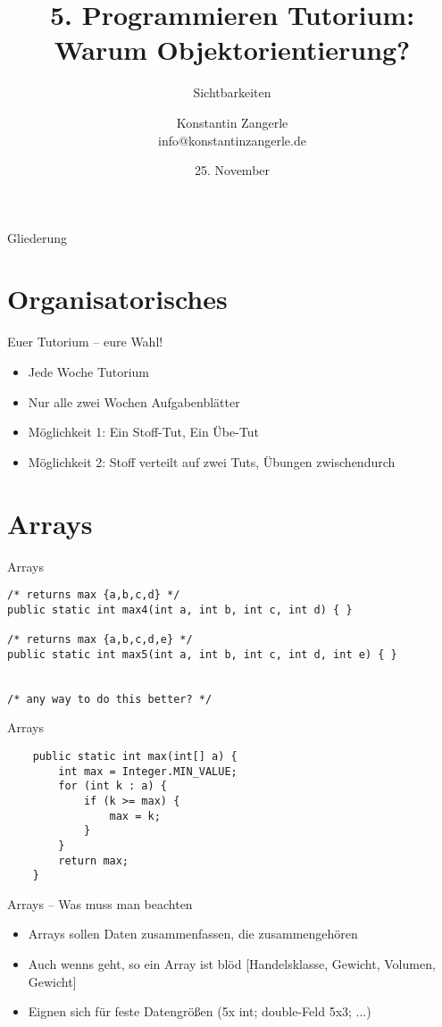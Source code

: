 \documentclass[18pt]{beamer}
\title[Programmieren Tutorium]{5. Programmieren Tutorium:\texorpdfstring{\\}{} Warum Objektorientierung?}
\subtitle{Sichtbarkeiten}
\author{Konstantin Zangerle \texorpdfstring{\\}{} info@konstantinzangerle.de}
\date{25. November}
\institute{Chair for Software Design and Quality}
\begin{document}

\begin{frame}
\titlepage
\end{frame}

\begin{frame}{Gliederung}
\tableofcontents
\end{frame}

\section{Organisatorisches} %
\begin{frame}{Euer Tutorium – eure Wahl!}
  \begin{itemize}
   \item Jede Woche Tutorium
   \item Nur alle zwei Wochen Aufgabenblätter
   \item Möglichkeit 1: Ein Stoff-Tut, Ein Übe-Tut
   \item Möglichkeit 2: Stoff verteilt auf zwei Tuts, Übungen zwischendurch
  \end{itemize}
\end{frame}

\section{Arrays} %
\begin{frame}[fragile]{Arrays}
\begin{lstlisting}
/* returns max {a,b,c,d} */
public static int max4(int a, int b, int c, int d) { } 

/* returns max {a,b,c,d,e} */
public static int max5(int a, int b, int c, int d, int e) { } 


/* any way to do this better? */
\end{lstlisting}
\end{frame}

\begin{frame}[fragile]{Arrays}
 \begin{lstlisting}
    public static int max(int[] a) {
        int max = Integer.MIN_VALUE;
        for (int k : a) {
            if (k >= max) {
                max = k;
            }
        }
        return max;
    }
 \end{lstlisting}
\end{frame}

\begin{frame}{Arrays – Was muss man beachten}
 \begin{itemize}
  \item Arrays sollen Daten zusammenfassen, die zusammengehören
  \item Auch wenns geht, so ein Array ist blöd [Handelsklasse, Gewicht, Volumen, Gewicht]
  \item Eignen sich für feste Datengrößen (5x int; double-Feld 5x3; ...)
 \end{itemize}

\end{frame}
\end{document}
